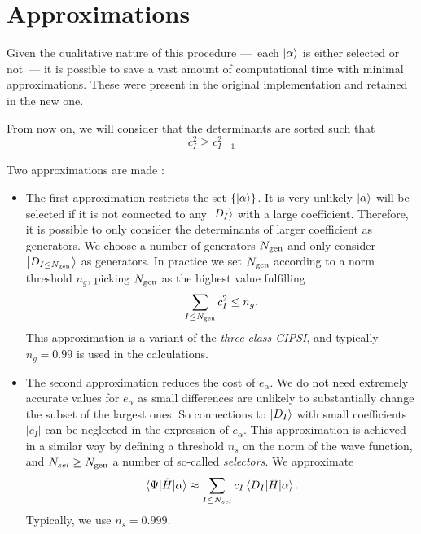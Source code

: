 \documentclass[./thesis.tex]{subfiles}
\begin{document}
\section{Approximations}
\label{sec:cipsi_approx}

Given the qualitative nature of this procedure ---~each ${\ket{\alpha}}$ is either selected or not~--- it is possible to save a vast amount of computational time with minimal approximations. These were present in the original implementation and retained in the new one.

From now on, we will consider that the determinants are sorted such that 
\begin{equation}
c^2_{I} \ge c_{I+1}^2
\end{equation}

Two approximations are made :

\begin{itemize}
\item
The first approximation restricts the set $\{{\ket{\alpha}}\}$. It is very unlikely $\ket \alpha$ will be selected if it is not connected to any ${\ket{D_I}}$ with a large coefficient. Therefore, it is possible to only consider the determinants of larger coefficient as generators. We choose a number of generators ${N_\text{gen}}$ and only consider $\ket{D_{I \leq {N_\text{gen}}}}$ as generators. In practice we set ${N_\text{gen}}$ according to a norm threshold $n_g$, picking ${N_\text{gen}}$ as the highest value fulfilling
\begin{equation}
\sum_{I \leq {N_\text{gen}}} c_I^2 \leq n_g.
\end{equation}
This approximation is a variant of the \emph{three-class CIPSI},\cite{Evangelisti_1983}
and typically $n_g=0.99$ is used in the calculations.
\item The second approximation reduces the cost of $e_\alpha$.
We do not need extremely accurate values for $e_\alpha$ as small differences are unlikely to substantially change the subset of the largest ones.
So  connections to $\ket {D_I}$ with small coefficients $|c_I|$ can be neglected
in the expression of $e_\alpha$.
This approximation is achieved in a similar way by defining a threshold $n_s$
on the norm of the wave function, and $N_{sel} \geq {N_\text{gen}}$ a number of so-called
\emph{selectors}. We approximate 
\begin{equation}
  \mel{\Psi}{\hat{H}}{\alpha} \approx \sum_{I \leq N_{sel}} c_I \mel{D_I}{\hat{H}}{\alpha}.
\end{equation}
Typically, we use $n_s = 0.999$.

\end{itemize}
\end{document}
